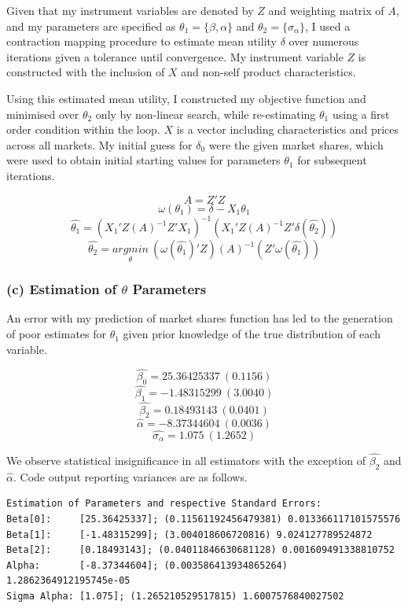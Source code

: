 \documentclass{article}
\begin{document}
Given that my instrument variables are denoted by $Z$ and weighting matrix of $A$, and my parameters are specified as $\theta_1=\{ \beta, \alpha \}$ and $\theta_2=\{ \sigma_\alpha \}$, I used a contraction mapping procedure to estimate mean utility $\delta$ over numerous iterations given a tolerance until convergence. My instrument variable $Z$ is constructed with the inclusion of $X$ and non-self product characteristics.

\par Using this estimated mean utility, I constructed my objective function and minimised over $\theta_2$ only by non-linear search, while re-estimating $\theta_1$ using a first order condition within the loop. $X$ is a vector including characteristics and prices across all markets. My initial guess for $\delta_0$ were the given market shares, which were used to obtain initial starting values for parameters $\theta_1$ for subsequent iterations.

$$A=Z'Z$$
$$\omega (\theta_1) = \delta - X_1 \theta_1$$
$$\hat{\theta_1}=(X_1'Z(A)^{-1}Z'X_1)^{-1}(X_1'Z(A)^{-1}Z'\delta (\hat{\theta_2}))$$
$$\hat{\theta_2}=\underset{\theta}{argmin}\:(\omega (\hat{\theta_1})'Z) (A)^{-1} (Z'\omega (\hat{\theta_1})) $$

\subsubsection{(c) Estimation of $\theta$ Parameters}

An error with my prediction of market shares function has led to the generation of poor estimates for $\theta_1$ given prior knowledge of the true distribution of each variable.

$$\hat{\beta_0}=25.36425337\:(0.1156)$$
$$\hat{\beta_1}=-1.48315299\:(3.0040)$$
$$\hat{\beta_2}=0.18493143\:(0.0401)$$
$$\hat{\alpha}=-8.37344604\:(0.0036)$$
$$\hat{\sigma_{\alpha}}=1.075\:(1.2652)$$

We observe statistical insignificance in all estimators with the exception of $\hat{\beta_2}$ and $\hat{\alpha}$. Code output reporting variances are as follows.

\begin{lstlisting}
Estimation of Parameters and respective Standard Errors:
Beta[0]:     [25.36425337]; (0.11561192456479381) 0.013366117101575576
Beta[1]:     [-1.48315299]; (3.004018606720816) 9.024127789524872
Beta[2]:     [0.18493143]; (0.04011846630681128) 0.001609491338810752
Alpha:       [-8.37344604]; (0.003586413934865264) 1.2862364912195745e-05
Sigma Alpha: [1.075]; (1.265210529517815) 1.6007576840027502
\end{lstlisting}
\end{document}
